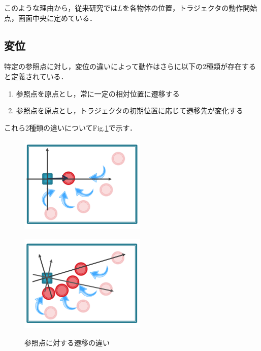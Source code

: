 このような理由から，従来研究では$L$を各物体の位置，トラジェクタの動作開始点，画面中央に定めている．

\subsection{変位}

特定の参照点に対し，変位の違いによって動作はさらに以下の2種類が存在すると定義されている．

	\begin{enumerate}
		\item 参照点を原点とし，常に一定の相対位置に遷移する
		\item 参照点を原点とし，トラジェクタの初期位置に応じて遷移先が変化する
	\end{enumerate}
これら2種類の違いについてFig.\ref{figure:2_difference_displacement}で示す．
\begin{figure}[h]
	\centering
	\begin{minipage}[t]{.4\textwidth}
		\centering
		\includegraphics[width=6cm]{figure2_2_sub_a.png} \\ %
		\label{subfigure:2_difference_displacement1}    
	\end{minipage}
	\begin{minipage}[t]{.4\textwidth}
		\centering
		\includegraphics[width=6cm]{figure2_2_sub_b.png} \\ %
		\label{subfigure:2_difference_displacement2}
	\end{minipage}
	\caption{参照点に対する遷移の違い}
	\label{figure:2_difference_displacement}
\end{figure}
